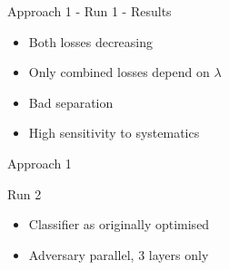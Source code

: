 \begin{frame}{Approach 1 - Run 1 - Results}
\begin{figure}[htbp]
\begin{subfigure}[b]{0.4\textwidth}
        \label{fig:simple:final:syst}
    \end{subfigure}
    \end{figure}
    \begin{itemize}
        \item Both losses decreasing
        \item Only combined losses depend on $\lambda$
        \item Bad separation
        \item High sensitivity to systematics
    \end{itemize}
\end{frame}

\begin{frame}{Approach 1}
    \begin{block}{Run 2}
\begin{itemize}
    \item Classifier as originally optimised
    \item Adversary parallel, 3 layers only
\end{itemize}
    \end{block}
\end{frame}

